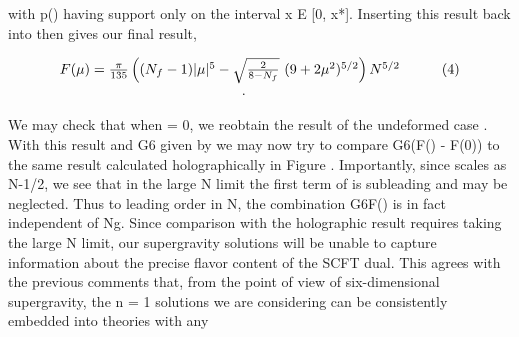 \documentclass{article}
\begin{document}
with p() having support only on the interval x E [0, x*]. Inserting this result back into then
gives our final result,


\begin{equation}
\begin{array} { c c } { F ( \mu ) = \frac { \pi } { 1 3 5 } \left ( ( N _ { f } - 1 ) | \mu | ^ { 5 } - \sqrt { \frac { 2 } { 8 - N _ { f } } } ~ ( 9 + 2 \mu ^ { 2 } ) ^ { 5 / 2 } \right ) N ^ { 5 / 2 } \qquad } & { ( 4 ) } \\ {. } \end{array}
\end{equation}


We may check that when  = 0, we reobtain the result of the undeformed case . With this
result and G6 given by we may now try to compare G6(F() - F(0)) to the same result
calculated holographically in Figure . Importantly, since  scales as N-1/2, we see that in
the large N limit the first term of is subleading and may be neglected. Thus to leading
order in N, the combination G6F() is in fact independent of Ng. Since comparison with
the holographic result requires taking the large N limit, our supergravity solutions will be
unable to capture information about the precise flavor content of the SCFT dual. This agrees
with the previous comments that, from the point of view of six-dimensional supergravity,
the n = 1 solutions we are considering can be consistently embedded into theories with any
\end{document}
